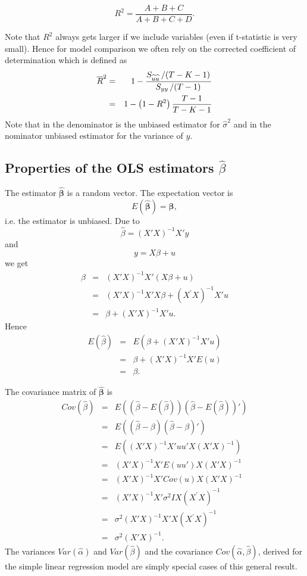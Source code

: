 \documentclass{article}
\begin{document}
\[ R^2=\frac{A+B+C}{A+B+C+D}.\]

Note that $R^2$ always gets larger if we include variables (even if t-statistic is very small). Hence for model comparison we often rely on the corrected coefficient of determination which is defined as
\begin{eqnarray*}
	\overline{R}^{2} &=&1-\frac{S_{\widehat{u}\widehat{u}}\left/ \left(
		T-K-1\right) \right. }{S_{yy}\left/ \left( T-1\right) \right. } \\
	&=&1-\left( 1-R^{2}\right) \frac{T-1}{T-K-1}
\end{eqnarray*}
Note that in the denominator is the unbiased estimator for $\hat{\sigma}^2$ and in the nominator unbiased estimator for the variance of $y$.

\subsection*{Properties of the OLS estimators $\hat\beta$}

The estimator $\mathbf{\hat{\beta}}$ is a random vector. The expectation vector is
\[ E(\mathbf{\hat{\beta}})=\mathbf{\beta }, \]
i.e. the estimator is unbiased. Due to
\[ \hat{\beta}=\left( X'X\right) ^{-1}X'y \]
and
\[ y=X\beta +u \]
we get
\begin{eqnarray*}
\hat{\beta} &=&\left( X'X\right) ^{-1}X'\left( X\beta
+u\right) \\
&=&\left( X'X\right) ^{-1}X'X\beta +\left( X^{\prime
}X\right) ^{-1}X'u \\
&=&\beta +\left( X'X\right) ^{-1}X'u.
\end{eqnarray*}%
Hence
\begin{eqnarray*}
E(\hat{\beta}) &=&E\left( \beta +\left( X'X\right) ^{-1}X'u\right) \\
&=&\beta +\left( X'X\right) ^{-1}X'E\left( u\right) \\
&=&\beta .
\end{eqnarray*}

The covariance matrix of $\mathbf{\hat{\beta}}$ is
\begin{eqnarray*}
Cov\left( \hat{\beta}\right) &=&E\left( \left( \hat{\beta}-E(\hat{\beta}%
)\right) \left( \hat{\beta}-E(\hat{\beta})\right) '\right) \\
&=&E\left( \left( \hat{\beta}-\beta \right) \left( \hat{\beta}-\beta \right)
'\right) \\
&=&E\left( \left( X'X\right) ^{-1}X'uu'X\left(
X'X\right) ^{-1}\right) \\
&=&\left( X'X\right) ^{-1}X'E\left( uu'\right)
X\left( X'X\right) ^{-1} \\
&=&\left( X'X\right) ^{-1}X'Cov\left( u\right) X\left(
X'X\right) ^{-1} \\
&=&\left( X'X\right) ^{-1}X'\sigma ^{2}IX\left( X^{\prime
}X\right) ^{-1} \\
&=&\sigma ^{2}\left( X'X\right) ^{-1}X'X\left( X^{\prime
}X\right) ^{-1} \\
&=&\sigma ^{2}\left( X'X\right) ^{-1}.
\end{eqnarray*}%
The variances $Var(\hat{\alpha})$ and $Var(\hat{\beta})$ and the covariance $%
Cov(\hat{\alpha},\hat{\beta})$, derived for the simple linear regression model are simply special cases of this general result.
\end{document}
